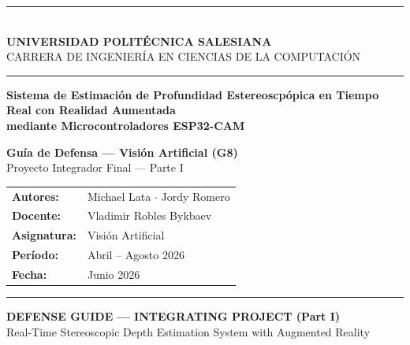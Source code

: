 \documentclass[11pt,a4paper]{article}
\begin{document}
\begin{titlepage}
\centering
\vspace*{0.8cm}
{\color{salesiana}\rule{\linewidth}{2pt}}\\[0.35cm]
{\Large\bfseries UNIVERSIDAD POLIT\'ECNICA SALESIANA}\\[0.15cm]
{\normalsize CARRERA DE INGENIER\'IA EN CIENCIAS DE LA COMPUTACI\'ON}\\[0.2cm]
{\color{salesiana}\rule{\linewidth}{1pt}}

\vspace{2.0cm}

\parbox{0.80\textwidth}{\centering\LARGE\bfseries\color{salesiana}
  Sistema de Estimaci\'on de Profundidad Estereoscp\'opica
  en Tiempo Real con Realidad Aumentada\\[0.3cm]
  \large mediante Microcontroladores ESP32-CAM
}

\vspace{1.4cm}

{\large\bfseries Gu\'ia de Defensa --- Visi\'on Artificial (G8)}\\[0.2cm]
{\normalsize Proyecto Integrador Final --- Parte I}

\vspace{1.6cm}

\begin{tabular}{@{}ll@{}}
\textbf{Autores:}    & Michael Lata $\cdot$ Jordy Romero \\[0.25cm]
\textbf{Docente:}    & Vladimir Robles Bykbaev \\[0.25cm]
\textbf{Asignatura:} & Visi\'on Artificial \\[0.25cm]
\textbf{Per\'iodo:}  & Abril -- Agosto 2026 \\[0.25cm]
\textbf{Fecha:}      & Junio 2026 \\
\end{tabular}

\vfill
{\color{salesiana}\rule{\linewidth}{2pt}}
\end{titlepage}

\begin{center}
{\large\bfseries\color{salesiana} DEFENSE GUIDE --- INTEGRATING PROJECT (Part I)}\\[6pt]
{\normalsize Real-Time Stereoscopic Depth Estimation System with Augmented Reality}
\end{center}
\end{document}
